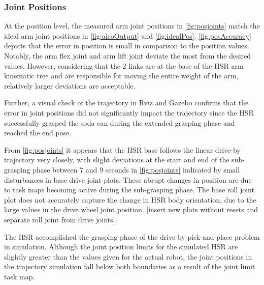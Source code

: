\documentclass[11pt]{article}
\begin{document}
        \subsubsection{Joint Positions} 
            At the position level, the measured arm joint positions in \cref{fig:posjoints} match the ideal arm joint positions in \cref{fig:aicoOutput} and \cref{fig:idealPos}. \cref{fig:posAccuracy} depicts that the error in position is small in comparison to the position values. Notably, the arm flex joint and arm lift joint deviate the most from the desired values. However, considering that the 2 links are at the base of the HSR arm kinematic tree and are responsible for moving the entire weight of the arm, relatively larger deviations are acceptable.
            \par Further, a visual check of the trajectory in Rviz and Gazebo confirms that the error in joint positions did not significantly impact the trajectory since the HSR successfully grasped the soda can during the extended grasping phase and reached the end pose. \par From \cref{fig:posjoints} it appears that the HSR base follows the linear drive-by trajectory very closely, with slight deviations at the start and end of the sub-grasping phase between 7 and 9 seconds in \cref{fig:posjoints} indicated by small disturbances in base drive joint plots. These abrupt changes in position are due to task maps becoming active during the sub-grasping phase. The base roll joint plot does not accurately capture the change in HSR body orientation, due to the large values in the drive wheel joint position. [insert new plots without resets and separate roll joint from drive joints].
            \par The HSR accomplished the grasping phase of the drive-by pick-and-place problem in simulation. Although the joint position limits for the simulated HSR are slightly greater than the values given for the actual robot, the joint positions in the trajectory simulation fall below both boundaries as a result of the joint limit task map.
\end{document}
